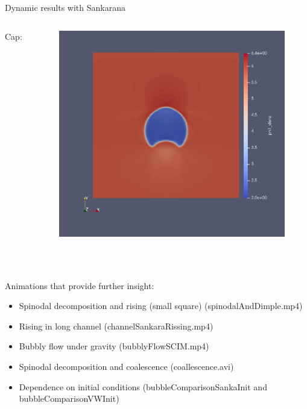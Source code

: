 \documentclass[8pt]{beamer}
\begin{document}
\begin{frame}[t]{Dynamic results with Sankarana}
\begin{columns}
			Cap:
			\begin{figure}
				\centering
				\includegraphics[width=1.0\textwidth]{pics/bubbles/dimple1st.png}
			\end{figure}
		\end{columns}
		
		~\\~\\Animations that provide further insight:
		\begin{itemize}
			\item Spinodal decomposition and rising (small square) (spinodalAndDimple.mp4)
			\item Rising in long channel (channelSankaraRissing.mp4)
			\item Bubbly flow under gravity (bubblyFlowSCIM.mp4)
			\item Spinodal decomposition and coalescence (coallescence.avi)
			\item Dependence on initial conditions (bubbleComparisonSankaInit and bubbleComparisonVWInit)
		\end{itemize}
	\end{frame}
\end{document}
